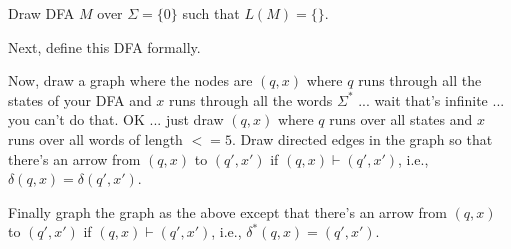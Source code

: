 \begin{tightlist}
\item Draw DFA $M$ over $\Sigma = \{0\}$ such that $L(M) = \{\}$.
\item Next, define this DFA formally.
\item Now, draw a graph where the nodes are $(q, x)$ where
$q$ runs through all the states of your DFA and $x$
runs through all the words $\Sigma^*$ ... wait
that's infinite ... you can't do that.
OK ... just draw $(q, x)$ where $q$ runs over all states
and $x$ runs over all words of length $<= 5$.
Draw directed edges in the graph so that
there's an arrow from $(q,x)$ to $(q', x')$ if
$(q, x) \vdash (q', x')$, i.e., $\delta(q, x) = \delta(q', x')$.
\item Finally graph the graph as the above except that
there's an arrow from $(q, x)$ to $(q', x')$
if $(q, x) \vdash (q', x')$, i.e.,
$\delta^*(q, x) = (q', x')$.
\end{tightlist}
